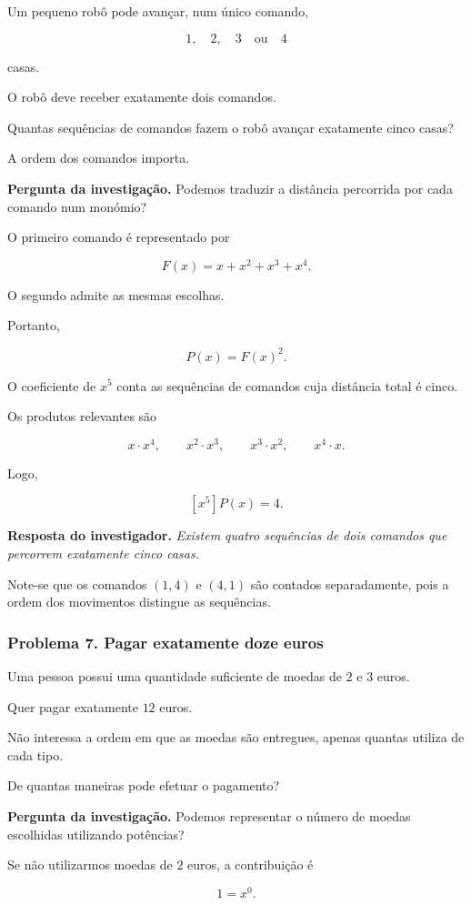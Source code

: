 \documentclass[11pt,a4paper,oneside]{book}
\newcommand{\Pergunta}[1]{\begin{perguntabox}\textbf{Pergunta da investigação.} #1\end{perguntabox}}
\newcommand{\Resposta}[1]{\textcolor{verdeescuro}{\textbf{Resposta do investigador.}} \emph{#1}\par}
\begin{document}
Um pequeno robô pode avançar,
num único comando,

\[
1,\quad2,\quad3
\quad\text{ou}\quad4
\]

casas.

O robô deve receber exatamente
dois comandos.

Quantas sequências de comandos
fazem o robô avançar exatamente
cinco casas?

A ordem dos comandos importa.

\Pergunta{Podemos traduzir a distância
percorrida por cada comando num monómio?}

O primeiro comando é representado por

\[
F(x)=x+x^2+x^3+x^4.
\]

O segundo admite as mesmas escolhas.

Portanto,

\[
P(x)=F(x)^2.
\]

O coeficiente de $x^5$
conta as sequências de comandos
cuja distância total é cinco.

Os produtos relevantes são

\[
x\cdot x^4,
\qquad
x^2\cdot x^3,
\qquad
x^3\cdot x^2,
\qquad
x^4\cdot x.
\]

Logo,

\[
[x^5]P(x)=\boxed{4}.
\]

\Resposta{Existem quatro sequências
de dois comandos que percorrem
exatamente cinco casas.}

Note-se que os comandos $(1,4)$
e $(4,1)$ são contados separadamente,
pois a ordem dos movimentos distingue
as sequências.

\subsubsection*{Problema 7. Pagar exatamente doze euros}

Uma pessoa possui uma quantidade
suficiente de moedas de $2$ e $3$ euros.

Quer pagar exatamente $12$ euros.

Não interessa a ordem em que
as moedas são entregues,
apenas quantas utiliza de cada tipo.

De quantas maneiras pode efetuar o pagamento?

\Pergunta{Podemos representar o número
de moedas escolhidas utilizando potências?}

Se não utilizarmos moedas de $2$ euros,
a contribuição é

\[
1=x^0.
\]
\end{document}
